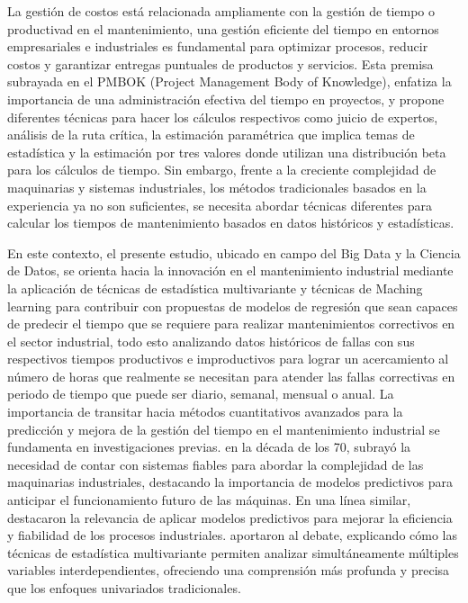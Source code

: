 \documentclass[
  11pt,
  bookmarksnumbered]{article}
\begin{document}
La gestión de costos está relacionada ampliamente con la gestión de tiempo o productivad en el mantenimiento, una gestión eficiente del tiempo en entornos empresariales e industriales es fundamental para optimizar procesos, reducir costos y garantizar entregas puntuales de productos y servicios.
Esta premisa subrayada en el PMBOK (Project Management Body of Knowledge), enfatiza la importancia de una administración efectiva del tiempo en proyectos, y propone diferentes técnicas para hacer los cálculos respectivos como juicio de expertos, análisis de la ruta crítica, la estimación paramétrica que implica temas de estadística y la estimación por tres valores donde utilizan una distribución beta para los cálculos de tiempo.
Sin embargo, frente a la creciente complejidad de maquinarias y sistemas industriales, los métodos tradicionales basados en la experiencia ya no son suficientes, se necesita abordar técnicas diferentes para calcular los tiempos de mantenimiento basados en datos históricos y estadísticas.

En este contexto, el presente estudio, ubicado en campo del Big Data y la Ciencia de Datos, se orienta hacia la innovación en el mantenimiento industrial mediante la aplicación de técnicas de estadística multivariante y técnicas de Maching learning para contribuir con propuestas de modelos de regresión que sean capaces de predecir el tiempo que se requiere para realizar mantenimientos correctivos en el sector industrial, todo esto analizando datos históricos de fallas con sus respectivos tiempos productivos e improductivos para lograr un acercamiento al número de horas que realmente se necesitan para atender las fallas correctivas en periodo de tiempo que puede ser diario, semanal, mensual o anual.
La importancia de transitar hacia métodos cuantitativos avanzados para la predicción y mejora de la gestión del tiempo en el mantenimiento industrial se fundamenta en investigaciones previas.
\textcite{Rojas} en la década de los 70, subrayó la necesidad de contar con sistemas fiables para abordar la complejidad de las maquinarias industriales, destacando la importancia de modelos predictivos para anticipar el funcionamiento futuro de las máquinas.
En una línea similar, \textcite{morochoycolegas} destacaron la relevancia de aplicar modelos predictivos para mejorar la eficiencia y fiabilidad de los procesos industriales.
\textcite{johnson2007applied} aportaron al debate, explicando cómo las técnicas de estadística multivariante permiten analizar simultáneamente múltiples variables interdependientes, ofreciendo una comprensión más profunda y precisa que los enfoques univariados tradicionales.
\end{document}
